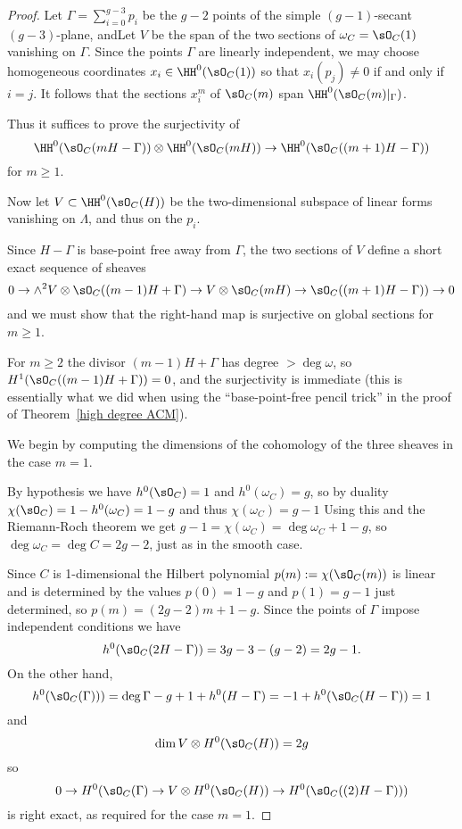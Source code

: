 \begin{proof}
Let $\Gamma = \sum_{i=0}^{g-3}p_i$ be the $g-2$ points of the
simple $(g-1)$-secant $(g-3)$-plane, andLet $V$ be the span of the two sections of $\omega_C = \sO_C(1)$
vanishing on $\Gamma$. Since the points $\Gamma$
are linearly independent, we may choose homogeneous coordinates $x_{i} \in \HH^{0}(\sO_{C}(1))$ so that
$x_{i}(p_{j}) \neq 0$ if and only if $i = j$. It follows that the sections
$x_{i}^{m}$ of $\sO_{C}(m)$ span $\HH^{0}(\sO_{C}(m)|_{\Gamma})$. 

Thus 
it suffices to prove the surjectivity of
$$
\HH^{0}(\sO_{C}(mH-\Gamma)) \otimes \HH^{0}(\sO_{C}(mH)) \to \HH^{0}(\sO_{C}((m+1)H-\Gamma))
$$
for  $m\geq 1$.

Now let
$V\subset \HH^{0}(\sO_{C}(H))$ be the two-dimensional subspace of linear forms vanishing on
$\Lambda$, and thus on the $p_{i}$. 

Since $H-\Gamma$ is base-point free away from $\Gamma$, the two sections of $V$
define a short exact sequence of sheaves
$$
0\to\wedge^2 V\otimes \sO_{C}((m-1)H+\Gamma)  \to V\otimes \sO_C(mH) \to  \sO_{C}((m+1)H-\Gamma)) \to 0
$$
and we must show that the right-hand map is surjective on global sections for $m\geq 1$.

For $m\geq 2$ the divisor $(m-1)H+\Gamma$ has degree $>\deg \omega$, so
$H^1(\sO_{C}((m-1)H+\Gamma)) = 0$, and the surjectivity is immediate (this is
essentially what we did when using the ``base-point-free pencil trick'' in the proof of Theorem~\ref{high degree ACM}).

We begin by computing the dimensions of the cohomology of the three sheaves in the case $m=1$.

By hypothesis
we have $h^0(\sO_C) = 1$ and $h^0(\omega_C) = g$, so by duality
$\chi(\sO_C) = 1 - h^0(\omega_C)= 1-g$ and thus $\chi(\omega_C) = g-1$ Using this and the Riemann-Roch theorem we get
$g-1 = \chi(\omega_C) = \deg \omega_C + 1-g$, so $\deg \omega_C = \deg C = 2g-2$, just as in the smooth case.

Since $C$ is 1-dimensional the Hilbert polynomial $p(m) := \chi(\sO_C(m))$ is linear and is determined by the values
$p(0) = 1-g$ and $p(1) = g-1$ just determined, so $p(m) = (2g-2)m+1-g$. Since the points of $\Gamma$ impose
independent conditions we have 
$$
h^0(\sO_C(2H-\Gamma)) = 3g-3 - (g-2) = 2g-1.
$$ 
On the other hand,
$$
h^0(\sO_C(\Gamma)))=\deg \Gamma -g+1+h^0(H-\Gamma) = -1 + h^0(\sO_C(H-\Gamma)) = 1
$$
and 
$$
\dim V \otimes H^0(\sO_C(H)) = 2g
$$
so
$$
0\to H^0(\sO_{C}(\Gamma)  \to V\otimes H^0(\sO_C(H)) \to H^0( \sO_{C}((2)H-\Gamma))) 
$$
is right exact, as required for the case $m=1$.
\end{proof}

